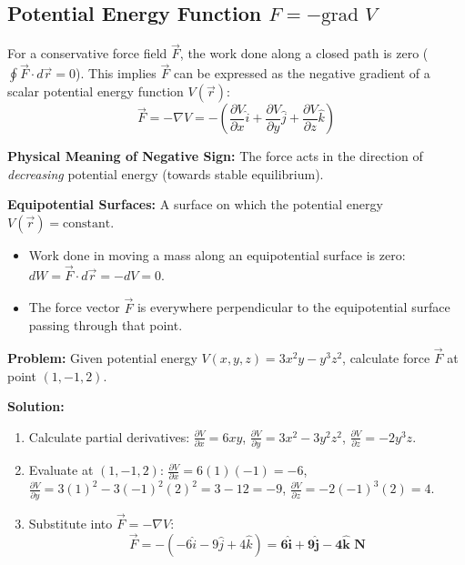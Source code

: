 \documentclass[12pt,a4paper]{article}
\begin{document}
\subsection{\texorpdfstring{Potential Energy Function $F = -\text{grad } V$}{Potential Energy Function F = -grad V}}

For a conservative force field $\vec{F}$, the work done along a closed path is zero ($\oint \vec{F} \cdot d\vec{r} = 0$). This implies $\vec{F}$ can be expressed as the negative gradient of a scalar potential energy function $V(\vec{r})$:
\begin{equation}
\vec{F} = -\nabla V = -\left(\frac{\partial V}{\partial x}\hat{i} + \frac{\partial V}{\partial y}\hat{j} + \frac{\partial V}{\partial z}\hat{k}\right)
\end{equation}

\textbf{Physical Meaning of Negative Sign:} The force acts in the direction of \textit{decreasing} potential energy (towards stable equilibrium).

\textbf{Equipotential Surfaces:} A surface on which the potential energy $V(\vec{r}) = \text{constant}$.
\begin{itemize}[leftmargin=*, itemsep=2pt]
  \item Work done in moving a mass along an equipotential surface is zero: $dW = \vec{F} \cdot d\vec{r} = -dV = 0$.
  \item The force vector $\vec{F}$ is everywhere perpendicular to the equipotential surface passing through that point.
\end{itemize}

\begin{tcolorbox}[examplebox, title={\textbf{Solved Problem 3: Deriving Force from Potential Energy}}]
\textbf{Problem:} Given potential energy $V(x,y,z) = 3x^2 y - y^3 z^2$, calculate force $\vec{F}$ at point $(1, -1, 2)$.

\textbf{Solution:}\par\noindent
\begin{enumerate}[leftmargin=*, itemsep=2pt]
  \item Calculate partial derivatives:
   $\frac{\partial V}{\partial x} = 6x y$, \quad $\frac{\partial V}{\partial y} = 3x^2 - 3y^2 z^2$, \quad $\frac{\partial V}{\partial z} = -2y^3 z$.
  \item Evaluate at $(1, -1, 2)$:
   $\frac{\partial V}{\partial x} = 6(1)(-1) = -6$, \quad $\frac{\partial V}{\partial y} = 3(1)^2 - 3(-1)^2(2)^2 = 3 - 12 = -9$, \quad $\frac{\partial V}{\partial z} = -2(-1)^3(2) = 4$.
  \item Substitute into $\vec{F} = -\nabla V$:
   \begin{equation}
   \vec{F} = -(-6\hat{i} - 9\hat{j} + 4\hat{k}) = \mathbf{6\hat{i} + 9\hat{j} - 4\hat{k} \text{ N}}
   \end{equation}
\end{enumerate}
\end{tcolorbox}
\end{document}
